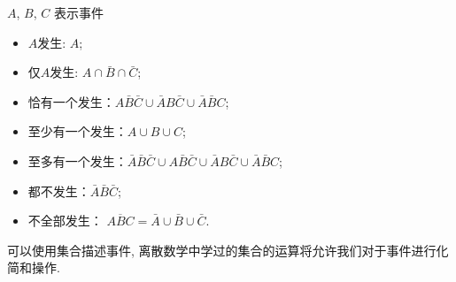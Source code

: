 \begin{example}
    $A$, $B$, $C$ 表示事件
    \begin{itemize}
        \item $A$发生: $A$;
        \item 仅$A$发生: $A\cap \bar{B}\cap \bar{C}$;
        \item 恰有一个发生：$A \bar B \bar C\cup \bar AB\bar C\cup \bar A\bar BC$;
        \item 至少有一个发生：$A\cup B\cup C$;
        \item 至多有一个发生：$\bar A\bar B\bar C\cup A \bar B \bar C \cup \bar AB\bar C\cup \bar A\bar BC$;
        \item 都不发生：$\bar A\bar B\bar C$;
        \item 不全部发生： $\overline{ABC}=\bar A\cup \bar B\cup \bar C$.
    \end{itemize}
\end{example}

\begin{takeaway}
{
    可以使用集合描述事件, 离散数学中学过的集合的运算将允许我们对于事件进行化简和操作.
}
\end{takeaway}